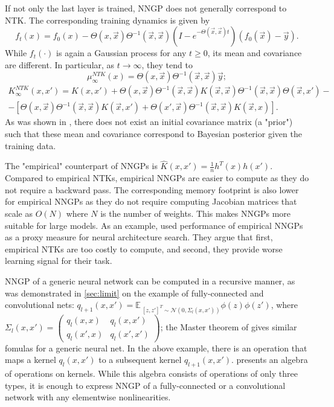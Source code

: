 \documentclass{article}
\newcommand{\EE}{\mathbb{E}\,}
\newcommand{\NN}{\mathcal{N}}
\begin{document}
    If not only the last layer is trained, NNGP does not generally correspond to NTK.
    The corresponding training dynamics is given by
    \begin{equation}
        f_t(x) = f_0(x) - \Theta(x,\vec x) \Theta^{-1}(\vec x,\vec x) \left(I - e^{-\Theta(\vec x,\vec x) t}\right) (f_0(\vec x) - \vec y).
    \end{equation}
    While $f_t(\cdot)$ is again a Gaussian process for any $t \geq 0$, its mean and covariance are different.
    In particular, as $t \to \infty$, they tend to
    \begin{equation}
        \mu_\infty^{NTK}(x) = \Theta(x,\vec x) \Theta^{-1}(\vec x,\vec x) \vec y;
    \end{equation}
    \begin{multline}
        K_\infty^{NTK}(x,x') 
        = K(x,x') 
        + \Theta(x,\vec x) \Theta^{-1}(\vec x,\vec x) K(\vec x,\vec x) \Theta^{-1}(\vec x,\vec x) \Theta(\vec x,x') 
        -\\- \left[\Theta(x,\vec x) \Theta^{-1}(\vec x,\vec x) K(\vec x,x') + \Theta(x',\vec x) \Theta^{-1}(\vec x,\vec x) K(\vec x,x)\right].
    \end{multline}
    As was shown in \cite{lee2019wide}, there does not exist an initial covariance matrix (a "prior") such that these mean and covariance correspond to Bayesian posterior given the training data.

    The "empirical" counterpart of NNGPs is $\hat K(x,x') = \frac{1}{n} h^T(x) h(x')$.
    Compared to empirical NTKs, empirical NNGPs are easier to compute as they do not require a backward pass.
    The corresponding memory footprint is also lower for empirical NNGPs as they do not require computing Jacobian matrices that scale as $O(N)$ where $N$ is the number of weights.
    This makes NNGPs more suitable for large models.
    As an example, \cite{park2020towards} used performance of empirical NNGPs as a proxy measure for neural architecture search.
    They argue that first, empirical NTKs are too costly to compute, and second, they provide worse learning signal for their task.

    NNGP of a generic neural network can be computed in a recursive manner, as was demonstrated in \cref{sec:limit} on the example of fully-connected and convolutional nets: $q_{l+1}(x,x') = \EE_{[z,z']^T \sim \NN(0,\Sigma_l(x,x'))} \phi(z) \phi(z')$, where $\Sigma_l(x,x') = \begin{pmatrix} q_l(x,x) & q_l(x,x') \\ q_l(x',x) & q_l(x',x') \end{pmatrix}$; the Master theorem of \cite{yang2019tensor_i} gives similar fomulas for a generic neural net.
    In the above example, there is an operation that maps a kernel $q_l(x,x')$ to a subsequent kernel $q_{l+1}(x,x')$.
    \cite{shankar2020neural} presents an algebra of operations on kernels.
    While this algebra consists of operations of only three types, it is enough to express NNGP of a fully-connected or a convolutional network with any elementwise nonlinearities.
\end{document}
